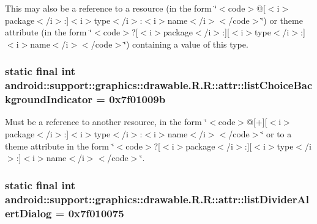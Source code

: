 This may also be a reference to a resource (in the form \char`\"{}$<$code$>$@\mbox{[}$<$i$>$package$<$/i$>$:\mbox{]}$<$i$>$type$<$/i$>$:$<$i$>$name$<$/i$>$$<$/code$>$\char`\"{}) or theme attribute (in the form \char`\"{}$<$code$>$?\mbox{[}$<$i$>$package$<$/i$>$:\mbox{]}\mbox{[}$<$i$>$type$<$/i$>$:\mbox{]}$<$i$>$name$<$/i$>$$<$/code$>$\char`\"{}) containing a value of this type. \hypertarget{classandroid_1_1support_1_1graphics_1_1drawable_1_1_r_1_1attr_7f633c311f4345782f99978dedf3fc80}{
\subsubsection[{listChoiceBackgroundIndicator}]{\setlength{\rightskip}{0pt plus 5cm}static final int android::support::graphics::drawable.R.R::attr::listChoiceBackgroundIndicator = 0x7f01009b}}
\label{classandroid_1_1support_1_1graphics_1_1drawable_1_1_r_1_1attr_7f633c311f4345782f99978dedf3fc80}


Must be a reference to another resource, in the form \char`\"{}$<$code$>$@\mbox{[}+\mbox{]}\mbox{[}$<$i$>$package$<$/i$>$:\mbox{]}$<$i$>$type$<$/i$>$:$<$i$>$name$<$/i$>$$<$/code$>$\char`\"{} or to a theme attribute in the form \char`\"{}$<$code$>$?\mbox{[}$<$i$>$package$<$/i$>$:\mbox{]}\mbox{[}$<$i$>$type$<$/i$>$:\mbox{]}$<$i$>$name$<$/i$>$$<$/code$>$\char`\"{}. \hypertarget{classandroid_1_1support_1_1graphics_1_1drawable_1_1_r_1_1attr_78af25252cbf0570ca0942b1d8a57af0}{
\subsubsection[{listDividerAlertDialog}]{\setlength{\rightskip}{0pt plus 5cm}static final int android::support::graphics::drawable.R.R::attr::listDividerAlertDialog = 0x7f010075}}
\label{classandroid_1_1support_1_1graphics_1_1drawable_1_1_r_1_1attr_78af25252cbf0570ca0942b1d8a57af0}


